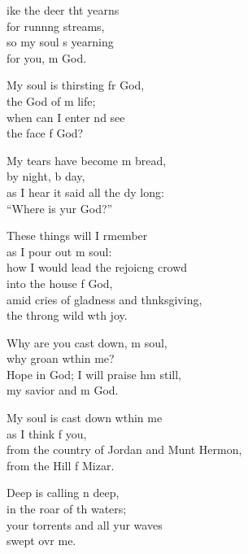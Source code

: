\settowidth{\versewidth}{from the country of Jordan and Mount Hermon, *}
\begin{psalmverse}%
  \begin{patverse}
ike the deer tht yearns\Med\\
for runn\pointup{\i}ng streams,\\
so my soul \pointup{\i}s yearning\Med\\
for you, m God.

My soul is thirsting fr God,\Med\\
the God of m life;\\
when can I enter nd see\Med\\
the face f God?

My tears have become m bread,\Med\\
by night, b day,\\
as I hear it said all the dy long:\Med\\
“Where is yur God?”

These things will I rmember\Med\\
as I pour out m soul:\\
how I would lead the rejoic\pointup{\i}ng crowd\Med\\
into the house f God,\\
amid cries of gladness and thnksgiving,\Med\\
the throng wild w\pointup{\i}th joy.

Why are you cast down, m soul,\Med\\
why groan w\pointup{\i}thin me?\\
Hope in God; I will praise h\pointup{\i}m still,\Med\\
my savior and m God.

My soul is cast down w\pointup{\i}thin me\Med\\
as I think f you,\\
from the country of Jordan and Munt Hermon,\Med\\
from the Hill f Mizar.

Deep is calling n deep,\Med\\
in the roar of th waters;\\
your torrents and all yur waves\Med\\
swept ovr me.


\end{patverse}
\end{psalmverse}

